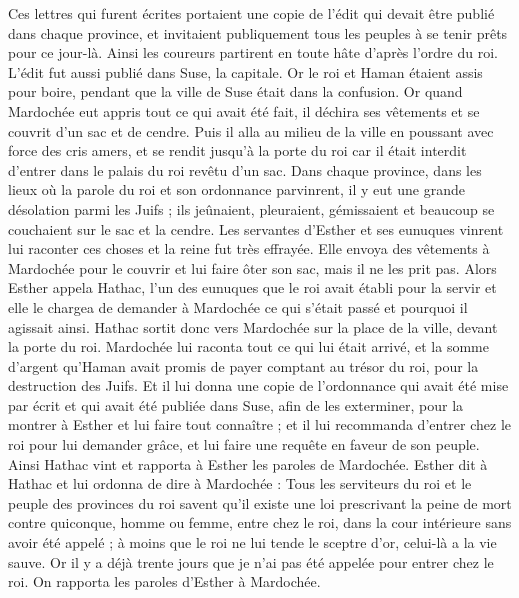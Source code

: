 \begin{multicols}{2}
Ces lettres qui furent écrites portaient une copie de l'édit qui devait être publié dans chaque province, et invitaient publiquement tous les peuples à se tenir prêts pour ce jour-là.
Ainsi les coureurs partirent en toute hâte d'après l'ordre du roi. L'édit fut aussi publié dans Suse, la capitale. Or le roi et Haman étaient assis pour boire, pendant que la ville de Suse était dans la confusion.
\VerseOne{}Or quand Mardochée eut appris tout ce qui avait été fait, il déchira ses vêtements et se couvrit d'un sac et de cendre. Puis il alla au milieu de la ville en poussant avec force des cris amers,
et se rendit jusqu'à la porte du roi car il était interdit d'entrer dans le palais du roi revêtu d'un sac.
Dans chaque province, dans les lieux où la parole du roi et son ordonnance parvinrent, il y eut une grande désolation parmi les Juifs ; ils jeûnaient, pleuraient, gémissaient et beaucoup se couchaient sur le sac et la cendre.
Les servantes d'Esther et ses eunuques vinrent lui raconter ces choses et la reine fut très effrayée. Elle envoya des vêtements à Mardochée pour le couvrir et lui faire ôter son sac, mais il ne les prit pas.
Alors Esther appela Hathac, l'un des eunuques que le roi avait établi pour la servir et elle le chargea de demander à Mardochée ce qui s'était passé et pourquoi il agissait ainsi.
Hathac sortit donc vers Mardochée sur la place de la ville, devant la porte du roi.
Mardochée lui raconta tout ce qui lui était arrivé, et la somme d'argent qu'Haman avait promis de payer comptant au trésor du roi, pour la destruction des Juifs.
Et il lui donna une copie de l'ordonnance qui avait été mise par écrit et qui avait été publiée dans Suse, afin de les exterminer, pour la montrer à Esther et lui faire tout connaître ; et il lui recommanda d'entrer chez le roi pour lui demander grâce, et lui faire une requête en faveur de son peuple.
Ainsi Hathac vint et rapporta à Esther les paroles de Mardochée.
Esther dit à Hathac et lui ordonna de dire à Mardochée :
Tous les serviteurs du roi et le peuple des provinces du roi savent qu'il existe une loi prescrivant la peine de mort contre quiconque, homme ou femme, entre chez le roi, dans la cour intérieure sans avoir été appelé ; à moins que le roi ne lui tende le sceptre d'or, celui-là a la vie sauve. Or il y a déjà trente jours que je n'ai pas été appelée pour entrer chez le roi.
On rapporta les paroles d'Esther à Mardochée.

\end{multicols}
